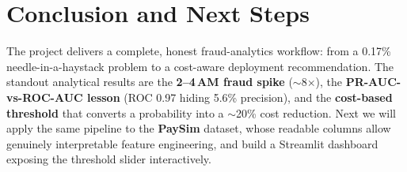 \documentclass[11pt,a4paper]{article}
\begin{document}
\section{Conclusion and Next Steps}
The project delivers a complete, honest fraud-analytics workflow: from a 0.17\%
needle-in-a-haystack problem to a cost-aware deployment recommendation. The
standout analytical results are the \textbf{2--4\,AM fraud spike}
($\sim$8$\times$), the \textbf{PR-AUC-vs-ROC-AUC lesson} (ROC 0.97 hiding 5.6\%
precision), and the \textbf{cost-based threshold} that converts a probability into
a $\sim$20\% cost reduction. Next we will apply the same pipeline to the
\textbf{PaySim} dataset, whose readable columns allow genuinely interpretable
feature engineering, and build a Streamlit dashboard exposing the threshold slider
interactively.
\end{document}
